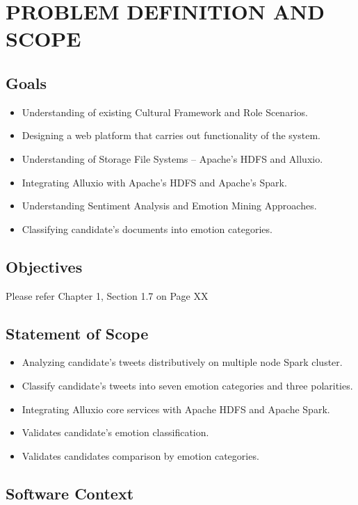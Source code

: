 \documentclass[oneside,a4paper,12pt]{pictreport}
\begin{document}
\chapter{PROBLEM DEFINITION AND SCOPE}

\section{Goals}
\begin{itemize}
\item Understanding of existing Cultural Framework and Role Scenarios.
\item Designing a web platform that carries out functionality of the system.
\item Understanding of Storage File Systems – Apache's HDFS and Alluxio.
\item Integrating Alluxio with Apache's HDFS and Apache's Spark.
\item Understanding Sentiment Analysis and Emotion Mining Approaches.
\item Classifying candidate's documents into emotion categories.
\end{itemize}

\section{Objectives}

Please refer Chapter 1, Section 1.7 on Page XX

\section{Statement of Scope}
\begin{itemize}
\item Analyzing candidate's tweets distributively on multiple node Spark cluster.
\item Classify candidate's tweets into seven emotion categories and three polarities.
\item Integrating Alluxio core services with Apache HDFS and Apache Spark.
\item Validates candidate's emotion classification.
\item Validates candidates comparison by emotion categories. 
\end{itemize}

\section{Software Context}
\end{document}
